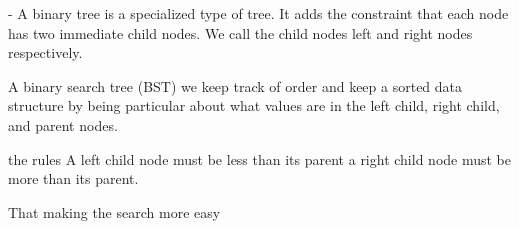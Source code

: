 - A binary tree is 
  a specialized type of tree. 
  It adds the constraint that each node has two immediate child nodes.
  We call the child nodes left and right nodes respectively.

A binary search tree (BST)
  we keep track of order and keep a sorted data structure by being particular about what values are in the left child, right child, and parent nodes.

  the rules
    A left child node must be less than its parent 
    a right child node must be more than its parent.

  That making the search more easy 

